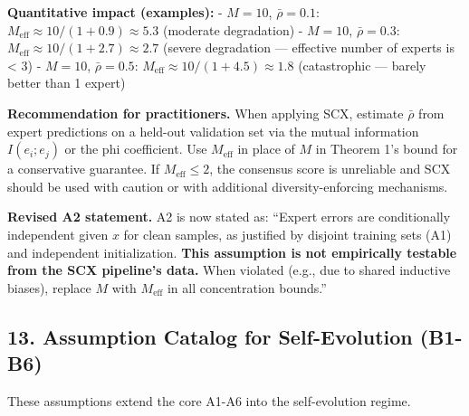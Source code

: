 \documentclass[
  12pt,
]{article}
\begin{document}
\textbf{Quantitative impact (examples):} - \(M = 10\),
\(\bar{\rho} = 0.1\): \(M_{\text{eff}} \approx 10/(1+0.9) \approx 5.3\)
(moderate degradation) - \(M = 10\), \(\bar{\rho} = 0.3\):
\(M_{\text{eff}} \approx 10/(1+2.7) \approx 2.7\) (severe degradation
--- effective number of experts is \textless{} 3) - \(M = 10\),
\(\bar{\rho} = 0.5\): \(M_{\text{eff}} \approx 10/(1+4.5) \approx 1.8\)
(catastrophic --- barely better than 1 expert)

\textbf{Recommendation for practitioners.} When applying SCX, estimate
\(\bar{\rho}\) from expert predictions on a held-out validation set via
the mutual information \(I(e_i; e_j)\) or the phi coefficient. Use
\(M_{\text{eff}}\) in place of \(M\) in Theorem 1's bound for a
conservative guarantee. If \(M_{\text{eff}} \leq 2\), the consensus
score is unreliable and SCX should be used with caution or with
additional diversity-enforcing mechanisms.

\textbf{Revised A2 statement.} A2 is now stated as: ``Expert errors are
conditionally independent given \(x\) for clean samples, as justified by
disjoint training sets (A1) and independent initialization. \textbf{This
assumption is not empirically testable from the SCX pipeline's data.}
When violated (e.g., due to shared inductive biases), replace \(M\) with
\(M_{\text{eff}}\) in all concentration bounds.''

\subsection{13. Assumption Catalog for Self-Evolution
(B1-B6)}\label{assumption-catalog-for-self-evolution-b1-b6}

These assumptions extend the core A1-A6 into the self-evolution regime.
\end{document}
